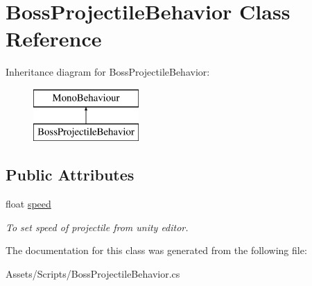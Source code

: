 \hypertarget{class_boss_projectile_behavior}{}\section{Boss\+Projectile\+Behavior Class Reference}
\label{class_boss_projectile_behavior}
Inheritance diagram for Boss\+Projectile\+Behavior\+:\begin{figure}[H]
\begin{center}
\leavevmode
\includegraphics[height=2.000000cm]{class_boss_projectile_behavior}
\end{center}
\end{figure}
\subsection*{Public Attributes}
\begin{DoxyCompactItemize}
\item 
\mbox{\label{class_boss_projectile_behavior_a87fd33ddd5893e4b57c9245240855d0e}} 
float \mbox{\hyperlink{class_boss_projectile_behavior_a87fd33ddd5893e4b57c9245240855d0e}{speed}}
\begin{DoxyCompactList}\small\item\em To set speed of projectile from unity editor. \end{DoxyCompactList}\end{DoxyCompactItemize}


The documentation for this class was generated from the following file\+:\begin{DoxyCompactItemize}
\item 
Assets/\+Scripts/Boss\+Projectile\+Behavior.\+cs\end{DoxyCompactItemize}
